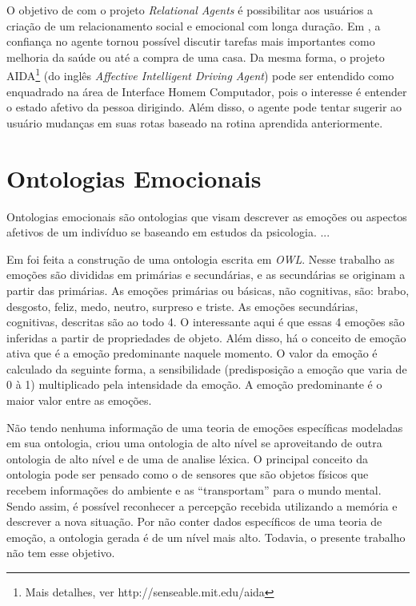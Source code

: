 O objetivo de \citet{bick2003relational} com o projeto \emph{Relational
Agents} é possibilitar aos usuários a criação de um relacionamento social e
emocional com longa duração.  Em \citet{bickmore2009virtual}, a confiança no
agente tornou possível discutir tarefas mais importantes como melhoria da saúde
ou até a compra de uma casa. Da mesma forma, o projeto
AIDA\footnote{Mais detalhes, ver http://senseable.mit.edu/aida} (do
inglês \emph{Affective Intelligent Driving Agent}) pode ser entendido como
enquadrado na área de Interface Homem Computador, pois o interesse é entender o
estado afetivo da pessoa dirigindo. Além disso, o agente pode tentar sugerir
ao usuário mudanças em suas rotas baseado na rotina aprendida anteriormente.

\section{Ontologias Emocionais} \label{cap:eda:oe}

Ontologias emocionais são ontologias que visam descrever as emoções ou
aspectos afetivos de um indivíduo se baseando em estudos da psicologia.
...

Em \citet{benta2007ontology} foi feita a construção de uma ontologia escrita
em \emph{OWL}. Nesse trabalho as emoções são divididas em primárias e
secundárias, e as secundárias se originam a partir das primárias. As emoções
primárias ou básicas, não cognitivas, são: brabo, desgosto, feliz, medo,
neutro, surpreso e triste. As emoções secundárias, cognitivas, descritas são
ao todo 4. O interessante aqui é que essas 4 emoções são inferidas a partir
de propriedades de objeto. Além disso, há o conceito de emoção ativa que é a
emoção predominante naquele momento. O valor da emoção é calculado da seguinte
forma, a sensibilidade (predisposição a emoção que varia de 0 à 1)
multiplicado pela intensidade da emoção. A emoção predominante é o maior valor
entre as emoções.

Não tendo nenhuma informação de uma teoria de emoções específicas modeladas em
sua ontologia, \citet{wks2008towards} criou uma ontologia de alto nível se
aproveitando de outra ontologia de alto nível e de uma de analise léxica. O
principal conceito da ontologia pode ser pensado como o de sensores que são
objetos físicos que recebem informações do ambiente e as ``transportam'' para
o mundo mental. Sendo assim, é possível reconhecer a percepção recebida
utilizando a memória e descrever a nova situação. Por não conter dados
específicos de uma teoria de emoção, a ontologia gerada é de um nível mais
alto. Todavia, o presente trabalho não tem esse objetivo\dev{}.

